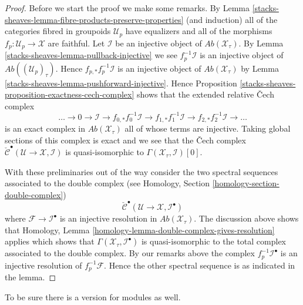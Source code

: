 \begin{proof}
Before we start the proof we make some remarks. By
Lemma \ref{stacks-sheaves-lemma-fibre-products-preserve-properties}
(and induction) all of the categories fibred in groupoids $\mathcal{U}_p$
have equalizers and all of the morphisms $f_p : \mathcal{U}_p \to \mathcal{X}$
are faithful. Let $\mathcal{I}$ be an injective object
of $\textit{Ab}(\mathcal{X}_\tau)$. By
Lemma \ref{stacks-sheaves-lemma-pullback-injective}
we see $f_p^{-1}\mathcal{I}$ is an injective object of
$\textit{Ab}((\mathcal{U}_p)_\tau)$.
Hence $f_{p, *}f_p^{-1}\mathcal{I}$ is an injective object of
$\textit{Ab}(\mathcal{X}_\tau)$ by
Lemma \ref{stacks-sheaves-lemma-pushforward-injective}.
Hence
Proposition \ref{stacks-sheaves-proposition-exactness-cech-complex}
shows that the extended relative {\v C}ech complex
$$
\ldots \to 0 \to
\mathcal{I} \to
f_{0, *}f_0^{-1}\mathcal{I} \to
f_{1, *}f_1^{-1}\mathcal{I} \to
f_{2, *}f_2^{-1}\mathcal{I} \to \ldots
$$
is an exact complex in $\textit{Ab}(\mathcal{X}_\tau)$ all of whose
terms are injective. Taking global sections of this complex is exact
and we see that the {\v C}ech complex
$\check{\mathcal{C}}^\bullet(\mathcal{U} \to \mathcal{X}, \mathcal{I})$
is quasi-isomorphic to $\Gamma(\mathcal{X}_\tau, \mathcal{I})[0]$.

\medskip\noindent
With these preliminaries out of the way consider the two spectral sequences
associated to the double complex (see
Homology, Section \ref{homology-section-double-complex})
$$
\check{\mathcal{C}}^\bullet(\mathcal{U} \to \mathcal{X}, \mathcal{I}^\bullet)
$$
where $\mathcal{F} \to \mathcal{I}^\bullet$ is an injective resolution
in $\textit{Ab}(\mathcal{X}_\tau)$.
The discussion above shows that
Homology, Lemma \ref{homology-lemma-double-complex-gives-resolution}
applies which shows that
$\Gamma(\mathcal{X}_\tau, \mathcal{I}^\bullet)$
is quasi-isomorphic to the total complex associated to the double complex.
By our remarks above the complex $f_p^{-1}\mathcal{I}^\bullet$ is an
injective resolution of $f_p^{-1}\mathcal{F}$. Hence the other spectral
sequence is as indicated in the lemma.
\end{proof}

To be sure there is a version for modules as well.


